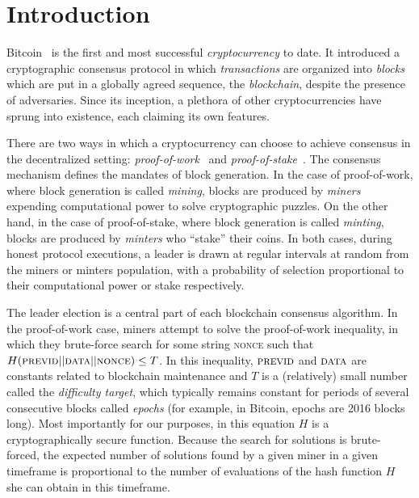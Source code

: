 
\section{Introduction}

Bitcoin~\cite{bitcoin} is the first and most successful \emph{cryptocurrency} to
date. It introduced a cryptographic consensus protocol in
which \emph{transactions} are organized into \emph{blocks} which are put in a
globally agreed sequence, the \emph{blockchain}, despite the presence of adversaries. Since its
inception, a plethora of other cryptocurrencies have sprung into existence, each
claiming its own features.

There are two ways in which a cryptocurrency can choose to achieve consensus in
the decentralized setting:
\emph{proof-of-work}~\cite{C:DwoNao92} and
\emph{proof-of-stake}~\cite{C:KRDO17}. The consensus mechanism defines the
mandates of block generation. In the case of proof-of-work, where block
generation is called \emph{mining}, blocks are produced by \emph{miners}
expending computational power to solve cryptographic puzzles. On the other hand,
in the case of proof-of-stake, where block generation is called \emph{minting},
blocks are produced by \emph{minters} who ``stake'' their coins. In both cases,
during honest protocol executions, a leader is drawn at regular intervals at random from the
miners or minters population, with a probability of selection proportional to
their computational power or stake respectively.

The leader election is a central part of each blockchain consensus algorithm. In
the proof-of-work case, miners attempt to solve the proof-of-work inequality, in
which they brute-force search for some string \textsc{nonce} such that
$H(\textsc{previd} || \textsc{data} || \textsc{nonce}) \leq T$. In this
inequality, $\textsc{previd}$ and $\textsc{data}$ are constants related to
blockchain maintenance and $T$ is a (relatively) small number called
the \emph{difficulty target}, which typically remains constant for periods of several
consecutive blocks called \emph{epochs} (for example, in Bitcoin, epochs are
2016 blocks long). Most importantly for our purposes, in this equation $H$ is a
cryptographically secure function. Because the search for solutions is
brute-forced, the expected number of solutions found by a given miner in a given
timeframe is proportional to the number of evaluations of the hash function $H$
she can obtain in this timeframe.


